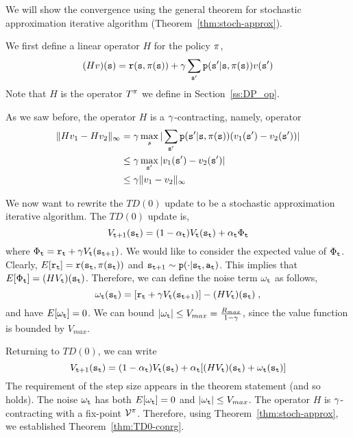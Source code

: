We will show the convergence using the general theorem for
stochastic approximation iterative algorithm
(Theorem~\ref{thm:stoch-approx}).

We first define a linear operator $H$ for the policy $\pi$,
\[
(Hv)({\tt s})={\tt r}({\tt s},\pi({\tt s}))+\gamma\sum_{{\tt s}'}{\tt p}({\tt s}'|{\tt s},\pi({\tt s}))v({\tt s}')
\]
Note that $H$ is the operator $T^\pi$ we define in
Section~\ref{ss:DP_op}.

As we saw before, the operator $H$ is a $\gamma$-contracting, namely,
operator
\begin{align*}
\|Hv_1-Hv_2\|_\infty &= \gamma \max_{s} |
\sum_{{\tt s}'}{\tt p}({\tt s}'|{\tt s},\pi({\tt s}))(v_1({\tt s}')-v_2({\tt s}'))|\\
&\leq \gamma\max_{{\tt s}'} |v_1({\tt s}')-v_2({\tt s}')|\\
&\leq \gamma \|v_1-v_2\|_\infty
\end{align*}

We now want to rewrite the $TD(0)$ update to be a stochastic
approximation iterative algorithm. The $TD(0)$ update is,
\[
V_{{\tt t}+1}({\tt s}_{\tt t})=(1-\alpha_{\tt t})V_{\tt t}({\tt s}_{\tt t})+\alpha_{\tt t}
\Phi_{\tt t}
\]
where $\Phi_{\tt t}={\tt r}_{\tt t}+\gamma
V_{\tt t}({\tt s}_{{\tt t}+1})$. We would like to consider the expected
value of $\Phi_{\tt t}$. Clearly,
$E[{\tt r}_{\tt t}]={\tt r}({\tt s}_{\tt t},\pi({\tt s}_{\tt t}))$
and ${\tt s}_{{\tt t}+1} \sim {\tt p}(\cdot |{\tt s}_{\tt t},{\tt a}_{\tt t})$.
This implies that $E[\Phi_{\tt t}]=(HV_{\tt t})({\tt s}_{\tt t})$.
Therefore, we can define the noise term $\omega_{\tt t}$ as follows,
\[
\omega_{\tt t}({\tt s}_{\tt t})=[{\tt r}_{\tt t}+\gamma
V_{\tt t}({\tt s}_{{\tt t}+1})]-(HV_{\tt t})({\tt s}_{\tt t})\;,
\]
and have $E[\omega_{\tt t}]=0$. We can bound $|\omega_{\tt t}|\leq
V_{max}=\frac{R_{max}}{1-\gamma}$, since the value function is
bounded by $V_{max}$.

Returning to $TD(0)$, we can write
\[
V_{{\tt t}+1}({\tt s}_{\tt t})=(1-\alpha_{\tt t})V_{\tt t}({\tt s}_{\tt t})+\alpha_{\tt t}
[(HV_{\tt t})({\tt s}_{\tt t})+\omega_{\tt t}({\tt s}_{\tt t})]
\]
The requirement of the step size appears in the theorem statement (and so holds). 
The noise $\omega_{\tt t}$ has both
$E[\omega_{\tt t}]=0$ and $|\omega_{\tt t}|\leq V_{max}$. The
operator $H$ is $\gamma$-contracting with a fix-point $\mathcal{V}^\pi$.
Therefore, using Theorem~\ref{thm:stoch-approx}, we established
Theorem~\ref{thm:TD0-conrg}.

